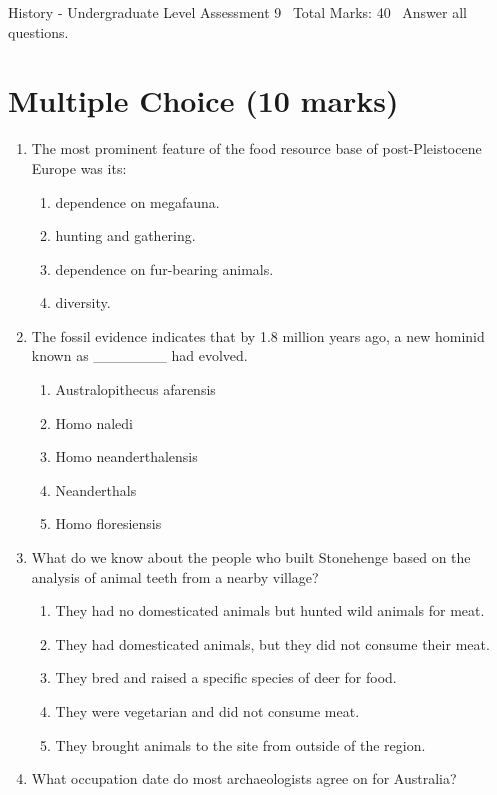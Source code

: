 \documentclass[12pt]{article}
\begin{document}
\begin{center}
History - Undergraduate Level Assessment 9 \
Total Marks: 40 \
Answer all questions.
\end{center}

\section*{Multiple Choice (10 marks)}
\begin{enumerate}[label=\arabic*.]
\item The most prominent feature of the food resource base of post-Pleistocene Europe was its:
\begin{enumerate}[label=(\alph*)]
    \item dependence on megafauna.
    \item hunting and gathering.
    \item dependence on fur-bearing animals.
    \item diversity.
\end{enumerate}
\item The fossil evidence indicates that by 1.8 million years ago, a new hominid known as \_\_\_\_\_\_\_ had evolved.
\begin{enumerate}[label=(\alph*)]
    \item Australopithecus afarensis
    \item Homo naledi
    \item Homo neanderthalensis
    \item Neanderthals
    \item Homo floresiensis
\end{enumerate}
\item What do we know about the people who built Stonehenge based on the analysis of animal teeth from a nearby village?
\begin{enumerate}[label=(\alph*)]
    \item They had no domesticated animals but hunted wild animals for meat.
    \item They had domesticated animals, but they did not consume their meat.
    \item They bred and raised a specific species of deer for food.
    \item They were vegetarian and did not consume meat.
    \item They brought animals to the site from outside of the region.
\end{enumerate}
\item What occupation date do most archaeologists agree on for Australia?

\end{enumerate}
\end{document}

